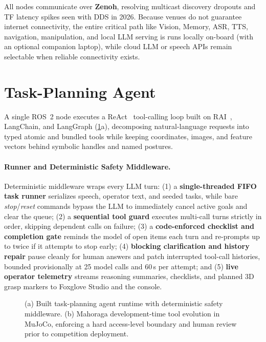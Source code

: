 \documentclass[a4paper]{llncs}
\begin{document}
All nodes communicate over \textbf{Zenoh}, resolving multicast discovery dropouts and TF latency spikes seen with DDS in 2026. Because venues do not guarantee internet connectivity, the entire critical path like Vision, Memory, ASR, TTS, navigation, manipulation, and local LLM serving is runs locally on-board (with an optional companion laptop), while cloud LLM or speech APIs remain selectable when reliable connectivity exists.

\section{Task-Planning Agent}
\label{sec:agent}

A single ROS~2 node executes a ReAct~\cite{yao2023react} tool-calling loop built on RAI~\cite{rachwal2025rai}, LangChain, and LangGraph (\cref{fig:agent-mahoraga}a), decomposing natural-language requests into typed atomic and bundled tools while keeping coordinates, images, and feature vectors behind symbolic handles and named postures.

\paragraph{Runner and Deterministic Safety Middleware.}
Deterministic middleware wraps every LLM turn: (1) a \textbf{single-threaded FIFO task runner} serializes speech, operator text, and seeded tasks, while bare \emph{stop}/\emph{reset} commands bypass the LLM to immediately cancel active goals and clear the queue; (2) a \textbf{sequential tool guard} executes multi-call turns strictly in order, skipping dependent calls on failure; (3) a \textbf{code-enforced checklist and completion gate} reminds the model of open items each turn and re-prompts up to twice if it attempts to stop early; (4) \textbf{blocking clarification and history repair} pause cleanly for human answers and patch interrupted tool-call histories, bounded provisionally at 25 model calls and 60\,s per attempt;%
{} and (5) \textbf{live operator telemetry} streams reasoning summaries, checklists, and planned 3D grasp markers to Foxglove Studio and the console.

\begin{figure}[tb]
  \centering
  \resizebox{0.77\textwidth}{!}{}
  \caption{(a) Built task-planning agent runtime with deterministic safety middleware. (b) Mahoraga development-time tool evolution in MuJoCo, enforcing a hard access-level boundary and human review prior to competition deployment.}
  \label{fig:agent-mahoraga}
\end{figure}
\end{document}
